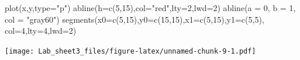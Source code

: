 \documentclass[
]{article}
\newenvironment{Shaded}{\begin{snugshade}}{\end{snugshade}}
\newcommand{\AttributeTok}[1]{\textcolor[rgb]{0.77,0.63,0.00}{#1}}
\newcommand{\DecValTok}[1]{\textcolor[rgb]{0.00,0.00,0.81}{#1}}
\newcommand{\FunctionTok}[1]{\textcolor[rgb]{0.00,0.00,0.00}{#1}}
\newcommand{\NormalTok}[1]{#1}
\newcommand{\StringTok}[1]{\textcolor[rgb]{0.31,0.60,0.02}{#1}}
\theoremstyle{remark}
\begin{document}
\begin{Shaded}
\begin{Highlighting}[]
\FunctionTok{plot}\NormalTok{(x,y,}\AttributeTok{type=}\StringTok{"p"}\NormalTok{)}
\FunctionTok{abline}\NormalTok{(}\AttributeTok{h=}\FunctionTok{c}\NormalTok{(}\DecValTok{5}\NormalTok{,}\DecValTok{15}\NormalTok{),}\AttributeTok{col=}\StringTok{"red"}\NormalTok{,}\AttributeTok{lty=}\DecValTok{2}\NormalTok{,}\AttributeTok{lwd=}\DecValTok{2}\NormalTok{)}
\FunctionTok{abline}\NormalTok{(}\AttributeTok{a =} \DecValTok{0}\NormalTok{, }\AttributeTok{b =} \DecValTok{1}\NormalTok{, }\AttributeTok{col =} \StringTok{"gray60"}\NormalTok{)}
\FunctionTok{segments}\NormalTok{(}\AttributeTok{x0=}\FunctionTok{c}\NormalTok{(}\DecValTok{5}\NormalTok{,}\DecValTok{15}\NormalTok{),}\AttributeTok{y0=}\FunctionTok{c}\NormalTok{(}\DecValTok{15}\NormalTok{,}\DecValTok{15}\NormalTok{),}\AttributeTok{x1=}\FunctionTok{c}\NormalTok{(}\DecValTok{5}\NormalTok{,}\DecValTok{15}\NormalTok{),}\AttributeTok{y1=}\FunctionTok{c}\NormalTok{(}\DecValTok{5}\NormalTok{,}\DecValTok{5}\NormalTok{),}
\AttributeTok{col=}\DecValTok{4}\NormalTok{,}\AttributeTok{lty=}\DecValTok{4}\NormalTok{,}\AttributeTok{lwd=}\DecValTok{2}\NormalTok{)}
\end{Highlighting}
\end{Shaded}

\texttt{[image: Lab\_sheet3\_files/figure-latex/unnamed-chunk-9-1.pdf]}
\end{document}
